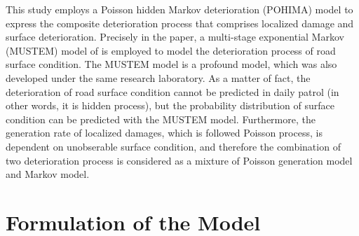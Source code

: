 \documentclass[Journal]{ascelike}
\begin{document}
This study employs a Poisson hidden Markov deterioration (POHIMA) model to express the composite deterioration process that comprises localized damage and surface deterioration. Precisely in the paper, a multi-stage exponential Markov (MUSTEM) model of \cite{kobayashitsuda} is employed to model the deterioration process of road surface condition. The MUSTEM model is a profound model, which was also developed under the same research laboratory. As a matter of fact, the deterioration of road surface condition cannot be predicted in daily patrol (in other words, it is hidden process), but the probability distribution of surface condition can be predicted with the MUSTEM model. Furthermore, the generation rate of localized damages, which is followed Poisson process, is dependent on unobserable surface condition, and therefore the combination of two deterioration process is considered as a mixture of  Poisson generation model and Markov model. 
%
\section{Formulation of the Model}\label{modelformulation}
\end{document}
